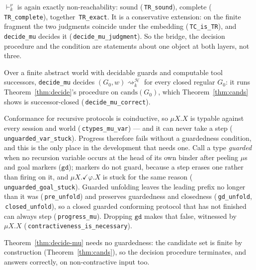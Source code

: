 \documentclass[a4paper,UKenglish,cleveref,autoref,thm-restate,anonymous]{lipics-v2021}
\newcommand{\Haz}{\mathcal H}
\newcommand{\safeRr}[1]{\vdash^{\nu}_{#1}}
\newcommand{\reachh}[1]{\rightsquigarrow^{\Haz}_{#1}}
\newcommand{\coqok}[1]{\textcolor{okgreen}{\ding{51}}\,\texttt{\small #1}}
\begin{document}
\begin{theorem}\label{thm:mu-judgment}
$\safeRr{k}$ is again exactly non-reachability: sound
(\coqok{TR\_sound}), complete (\coqok{TR\_complete}), together
\coqok{TR\_exact}. It is a conservative extension: on the finite fragment the
two judgments coincide under the embedding (\coqok{TC\_is\_TR}), and
\texttt{decide\_mu} decides it (\coqok{decide\_mu\_judgment}). So the bridge,
the decision procedure and the condition are statements about one object at
both layers, not three.
\end{theorem}

\begin{theorem}\label{thm:decide-mu}
Over a finite abstract world with decidable guards and computable tool
successors, \texttt{decide\_mu} decides $(G_0,w)\reachh{k}$ for every closed
regular $G_0$: it runs Theorem~\ref{thm:decide}'s procedure on
$\mathrm{cands}(G_0)$, which Theorem~\ref{thm:cands} shows is
successor-closed (\coqok{decide\_mu\_correct}).
\end{theorem}

\begin{theorem}\label{thm:guarded}
Conformance for recursive protocols is coinductive, so $\mu X.X$ is typable
against every session and world (\coqok{ctypes\_mu\_var}) --- and it can never
take a step (\coqok{unguarded\_var\_stuck}). Progress therefore fails without
a guardedness condition, and this is the only place in the development that
needs one. Call a type \emph{guarded} when no recursion variable occurs at the
head of its own binder after peeling $\mu$s and goal markers ($\mathtt{gd}$);
markers do not guard, because a step erases one rather than firing on it, and
$\mu X.\checkmark\varphi.X$ is stuck for the same reason
(\coqok{unguarded\_goal\_stuck}). Guarded unfolding leaves the leading prefix
no longer than it was (\coqok{pre\_unfold}) and preserves guardedness and
closedness (\coqok{gd\_unfold}, \coqok{closed\_unfold}), so a closed guarded
conforming protocol that has not finished can always step
(\coqok{progress\_mu}). Dropping $\mathtt{gd}$ makes that false, witnessed by
$\mu X.X$ (\coqok{contractiveness\_is\_necessary}).
\end{theorem}

Theorem~\ref{thm:decide-mu} needs no guardedness: the candidate set is finite by
construction (Theorem~\ref{thm:cands}), so the decision procedure terminates,
and answers correctly, on non-contractive input too.
\end{document}
